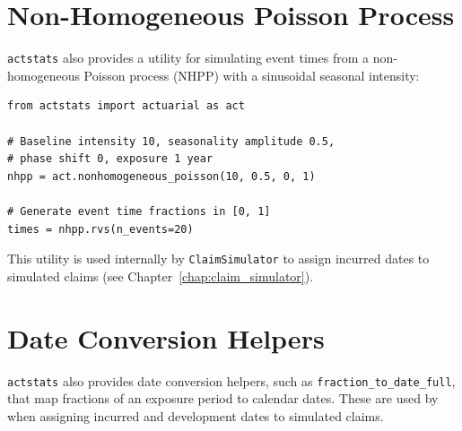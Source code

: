 \section{Non-Homogeneous Poisson Process}

\texttt{actstats} also provides a utility for simulating event times from
a non-homogeneous Poisson process (NHPP) with a sinusoidal seasonal
intensity:

\begin{lstlisting}[style=pythonstyle]
from actstats import actuarial as act

# Baseline intensity 10, seasonality amplitude 0.5,
# phase shift 0, exposure 1 year
nhpp = act.nonhomogeneous_poisson(10, 0.5, 0, 1)

# Generate event time fractions in [0, 1]
times = nhpp.rvs(n_events=20)
\end{lstlisting}

This utility is used internally by \texttt{ClaimSimulator} to assign
incurred dates to simulated claims (see
Chapter~\ref{chap:claim_simulator}).

\section{Date Conversion Helpers}

\texttt{actstats} also provides date conversion helpers, such as
\texttt{fraction\_to\_date\_full}, that map fractions of an exposure
period to calendar dates. These are used by \actsim when assigning
incurred and development dates to simulated claims.
